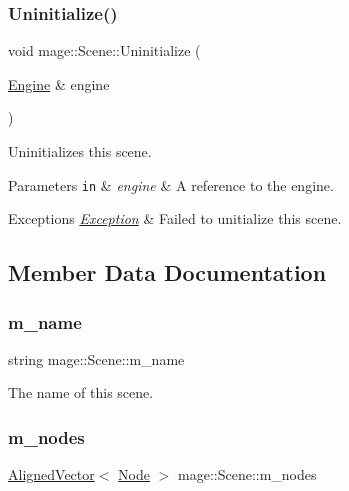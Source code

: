 \subsubsection{\texorpdfstring{Uninitialize()}{Uninitialize()}}
{\footnotesize\ttfamily void mage\+::\+Scene\+::\+Uninitialize (\begin{DoxyParamCaption}\item[{\hyperlink{classmage_1_1_engine}{Engine} \&}]{engine }\end{DoxyParamCaption})}

Uninitializes this scene.


\begin{DoxyParams}[1]{Parameters}
\mbox{\tt in}  & {\em engine} & A reference to the engine. \\
\hline
\end{DoxyParams}

\begin{DoxyExceptions}{Exceptions}
{\em \hyperlink{classmage_1_1_exception}{Exception}} & Failed to unitialize this scene. \\
\hline
\end{DoxyExceptions}


\subsection{Member Data Documentation}
\hypertarget{classmage_1_1_scene_a6cc8cb08b1853c4e3063b33a94e8fb47}{}\label{classmage_1_1_scene_a6cc8cb08b1853c4e3063b33a94e8fb47} 
\subsubsection{\texorpdfstring{m\+\_\+name}{m\_name}}
{\footnotesize\ttfamily string mage\+::\+Scene\+::m\+\_\+name\hspace{0.3cm}{\ttfamily [private]}}

The name of this scene. \hypertarget{classmage_1_1_scene_a270ac4a26210b95ba05957af19c4c43c}{}\label{classmage_1_1_scene_a270ac4a26210b95ba05957af19c4c43c} 
\subsubsection{\texorpdfstring{m\+\_\+nodes}{m\_nodes}}
{\footnotesize\ttfamily \hyperlink{namespacemage_a8664bfb5ce2179fc64eae9f82c8a5ba8}{Aligned\+Vector}$<$ \hyperlink{classmage_1_1_node}{Node} $>$ mage\+::\+Scene\+::m\+\_\+nodes\hspace{0.3cm}{\ttfamily [private]}}

